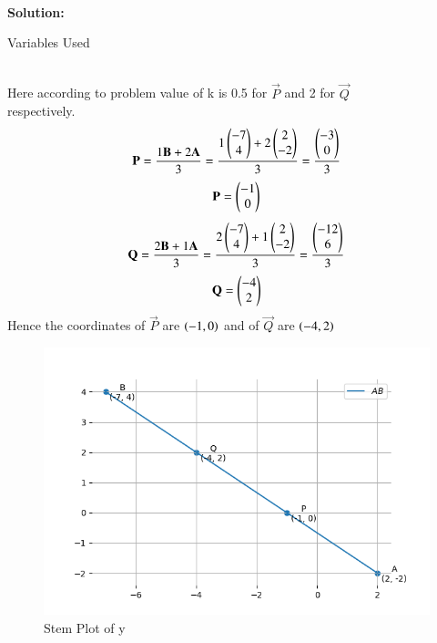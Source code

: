 \documentclass[journal]{IEEEtran}
\begin{document}
\hfill{}\\
\textbf{Solution: }
\begin{table}[h!]    
  \centering
  
  \caption{Variables Used}
  \label{tab10.5.3.9.1}
\end{table}\\
Here according to problem value of k is 0.5 for $\vec{P}$ and 2 for $\vec{Q}$\\ respectively.
\begin{align}
\mathbf{P}=\frac{1\mathbf{B}+2\mathbf{A}}{3}=\frac{1\begin{pmatrix}-7\\4\end{pmatrix}+2\begin{pmatrix}2\\-2\end{pmatrix}}{3}=\frac{\begin{pmatrix}-3\\0\end{pmatrix}}{3}\\
\end{align}
\begin{align}
\mathbf{P}=\begin{pmatrix}-1\\0\end{pmatrix}
\end{align}
\begin{align}
\mathbf{Q}=\frac{2\mathbf{B}+1\mathbf{A}}{3}=\frac{2\begin{pmatrix}-7\\4\end{pmatrix}+1\begin{pmatrix}2\\-2\end{pmatrix}}{3}=\frac{\begin{pmatrix}-12\\6\end{pmatrix}}{3}\\
\end{align}
\begin{align}
\mathbf{Q}=\begin{pmatrix}-4\\2\end{pmatrix}
\end{align}
Hence the coordinates of $\vec{P}$ are $\left(-1,0\right)$ and of $\vec{Q}$ are $\left(-4,2\right)$
\begin{figure}[h!]
   \centering
   \includegraphics[width=0.7\linewidth]{figs/Fig2.png}
   \caption{Stem Plot of y}
   \label{stemplot}
\end{figure}
\end{document}
